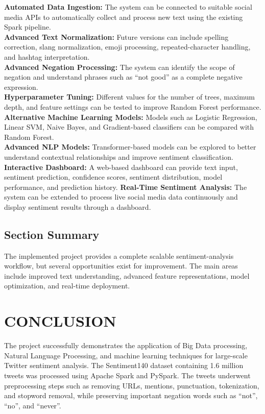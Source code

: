 \documentclass[12pt,a4paper]{article}
\begin{document}
\textbf{Automated Data Ingestion:} The system can be connected to suitable social media APIs to automatically collect and process new text using the existing Spark pipeline.\\
\textbf{Advanced Text Normalization:} Future versions can include spelling correction, slang normalization, emoji processing, repeated-character handling, and hashtag interpretation.\\
\textbf{Advanced Negation Processing:} The system can identify the scope of negation and understand phrases such as “not good” as a complete negative expression.\\
\textbf{Hyperparameter Tuning:} Different values for the number of trees, maximum depth, and feature settings can be tested to improve Random Forest performance.\\
\textbf{Alternative Machine Learning Models:} Models such as Logistic Regression, Linear SVM, Naive Bayes, and Gradient-based classifiers can be compared with Random Forest.\\
\textbf{Advanced NLP Models:} Transformer-based models can be explored to better understand contextual relationships and improve sentiment classification.\\
\textbf{Interactive Dashboard:} A web-based dashboard can provide text input, sentiment prediction, confidence scores, sentiment distribution, model performance, and prediction history.
\textbf{Real-Time Sentiment Analysis:} The system can be extended to process live social media data continuously and display sentiment results through a dashboard.\\
\subsection{Section Summary}

The implemented project provides a complete scalable sentiment-analysis workflow, but several opportunities exist for improvement. The main areas include improved text understanding, advanced feature representations, model optimization, and real-time deployment.

\newpage
\section{CONCLUSION}

The project successfully demonstrates the application of Big Data processing, Natural Language Processing, and machine learning techniques for large-scale Twitter sentiment analysis. The Sentiment140 dataset containing 1.6 million tweets was processed using Apache Spark and PySpark. The tweets underwent preprocessing steps such as removing URLs, mentions, punctuation, tokenization, and stopword removal, while preserving important negation words such as “not”, “no”, and “never”.
\end{document}
